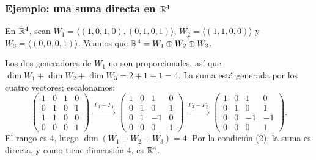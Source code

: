 \begin{frame}
    \frametitle{Ejemplo: una suma directa en $\mathbb{R}^4$}

    \begin{example}
        En $\mathbb{R}^4$, sean $W_1=\langle(1,0,1,0),(0,1,0,1)\rangle$,
        $W_2=\langle(1,1,0,0)\rangle$ y $W_3=\langle(0,0,0,1)\rangle$.
        Veamos que $\mathbb{R}^4=W_1\oplus W_2\oplus W_3$.
    \end{example}

    Los dos generadores de $W_1$ no son proporcionales, así que
    $\dim W_1+\dim W_2+\dim W_3=2+1+1=4$. La suma está generada por los
    cuatro vectores; escalonamos:
    \[
        \begin{pmatrix}1&0&1&0\\0&1&0&1\\1&1&0&0\\0&0&0&1\end{pmatrix}
        \xrightarrow{\;F_3-F_1\;}
        \begin{pmatrix}1&0&1&0\\0&1&0&1\\0&1&-1&0\\0&0&0&1\end{pmatrix}
        \xrightarrow{\;F_3-F_2\;}
        \begin{pmatrix}1&0&1&0\\0&1&0&1\\0&0&-1&-1\\0&0&0&1\end{pmatrix}.
    \]
    El rango es $4$, luego $\dim(W_1+W_2+W_3)=4$. Por la
    condición (2), la suma es directa, y como tiene dimensión $4$, es
    $\mathbb{R}^4$.
\end{frame}


